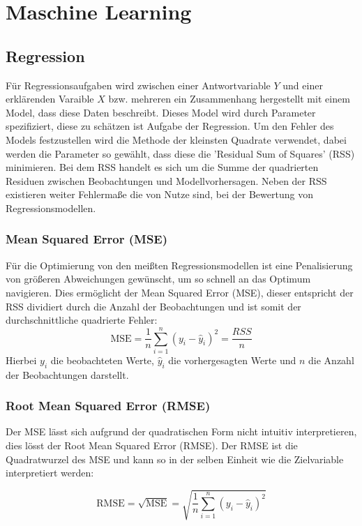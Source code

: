 
\section{Maschine Learning}
\label{sec:maschinelearning}
\subsection{Regression}
Für Regressionsaufgaben wird zwischen einer Antwortvariable \(Y\) und einer erklärenden Varaible \(X\) bzw. mehreren ein Zusammenhang hergestellt mit einem Model, dass diese Daten beschreibt. Dieses Model wird durch Parameter spezifiziert, diese zu schätzen ist Aufgabe der Regression. Um den Fehler des Models festzustellen wird die Methode der kleinsten Quadrate verwendet, dabei werden die Parameter so gewählt, dass diese die 'Residual Sum of Squares' (RSS) minimieren. Bei dem RSS handelt es sich um die Summe der quadrierten Residuen zwischen Beobachtungen und Modellvorhersagen. Neben der RSS existieren weiter Fehlermaße die von Nutze sind, bei der Bewertung von Regressionsmodellen.

\subsubsection{Mean Squared Error (MSE)}
Für die Optimierung von den meißten Regressionsmodellen ist eine Penalisierung von größeren Abweichungen gewünscht, um so schnell an das Optimum navigieren. Dies ermöglicht der Mean Squared Error (MSE), dieser entspricht der RSS dividiert durch die Anzahl der Beobachtungen und ist somit der durchschnittliche quadrierte Fehler:
\begin{equation}
  \text{MSE} = \frac{1}{n} \sum_{i=1}^{n} (y_i - \hat{y}_i)^2 = \frac{RSS}{n}
  \label{eq:mse}
\end{equation}
Hierbei \(y_i\) die beobachteten Werte, \(\hat{y}_i\) die vorhergesagten Werte und \(n\) die Anzahl der Beobachtungen darstellt.

\subsubsection{Root Mean Squared Error (RMSE)}
Der MSE lässt sich aufgrund der quadratischen Form nicht intuitiv interpretieren, dies lösst der Root Mean Squared Error (RMSE). Der RMSE ist die Quadratwurzel des MSE und kann so in der selben Einheit wie die Zielvariable interpretiert werden:

\begin{equation}
  \text{RMSE} = \sqrt{\text{MSE}} = \sqrt{\frac{1}{n} \sum_{i=1}^{n} (y_i - \hat{y}_i)^2}
  \label{eq:rmse}
\end{equation}

